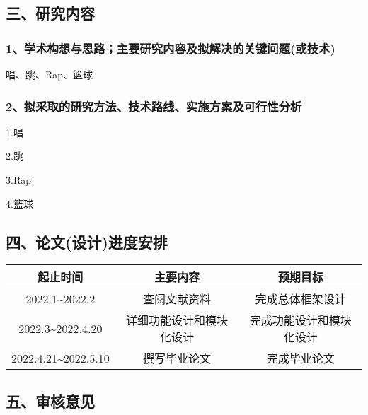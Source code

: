 \documentclass[UTF8,zihao=-4]{oucart}
\begin{document}
    \subsection*{三、研究内容}

    \begin{framed}


        \subsubsection*{1、学术构想与思路；主要研究内容及拟解决的关键问题(或技术)}

        唱、跳、Rap、篮球

        \subsubsection*{2、拟采取的研究方法、技术路线、实施方案及可行性分析}

        1.唱

        2.跳

        3.Rap

        4.篮球
    \end{framed}

    \newpage

    \subsection*{四、论文(设计)进度安排}

    \noindent
    \begin{tabular}{|c|c|c|}
        \hline
        起止时间                   & 主要内容         & 预期目标         \\
        \hline
        2022.1\~{}2022.2       & 查阅文献资料       & 完成总体框架设计     \\
        \hline
        2022.3\~{}2022.4.20    & 详细功能设计和模块化设计 & 完成功能设计和模块化设计 \\
        \hline
        2022.4.21\~{}2022.5.10 & 撰写毕业论文       & 完成毕业论文       \\
        \hline
    \end{tabular}

    \subsection*{五、审核意见}

    \begin{framed}
        \vspace{50mm}
        \begin{flushright}
            \par
            \makebox[10mm]{}\par
        \end{flushright}
    \end{framed}
\end{document}
